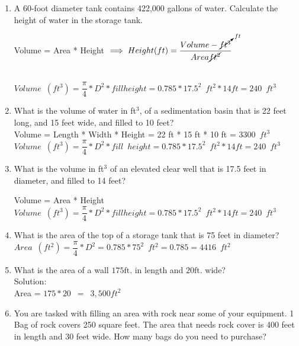 \documentclass{article}
\begin{document}
\begin{enumerate}
\item A 60-foot diameter tank contains 422,000 gallons of water. Calculate the height of water in the storage tank.

Volume = Area * Height $\implies Height (ft) =\dfrac{Volume - \cancelto{ft}{ft^3}}{Area \cancel{ft^2}}$\\
\vspace{0.2cm}
\

$ Volume \enspace (ft^3) = \dfrac{\pi}{4}*D^2 * fill height = 0.785*17.5^2 \enspace ft^2 * 14 ft=\boxed{240\enspace ft^3}$


\item What is the volume of water in ft$^3$, of a sedimentation basin that is 22 feet long, and 15 feet wide, and filled to 10 feet?\\

Volume = Length * Width * Height = 22 ft * 15 ft * 10 ft = $\boxed{3300 \enspace ft^3}$\\
\vspace{0.2cm}
$ Volume \enspace (ft^3) = \dfrac{\pi}{4}*D^2 * fill \enspace height = 0.785*17.5^2 \enspace ft^2 * 14 ft=\boxed{240\enspace ft^3}$

\item What is the volume in ft$^3$ of an elevated clear well that is 17.5 feet in diameter, and filled to 14 feet?

Volume = Area * Height\\
\vspace{0.2cm}
$ Volume \enspace (ft^3) = \dfrac{\pi}{4}*D^2 * fill height = 0.785*17.5^2 \enspace ft^2 * 14 ft=\boxed{240\enspace ft^3}$

\item What is the area of the top of a storage tank that is 75 feet in diameter?\\

$Area \enspace (ft^2)= \dfrac{\pi}{4}*D^2= 0.785*75^2 \enspace ft^2=0.785 = \boxed{4416\enspace ft^2}$\\
\vspace{0.2cm}

\item  What is the area of a wall $175 \mathrm{ft}$. in length and $20 \mathrm{ft}$. wide?\\
\vspace{0.2cm}
Solution:\\
\vspace{0.2cm}
Area = $175 * 20 \enspace = \enspace \boxed{3,500 ft^2}$
\vspace{0.2cm}
\item  You are tasked with filling an area with rock near some of your equipment. 1 Bag of rock covers 250 square feet. The area that needs rock cover is 400 feet in length and 30 feet wide. How many bags do you need to purchase?\\


\end{enumerate}
\end{document}
